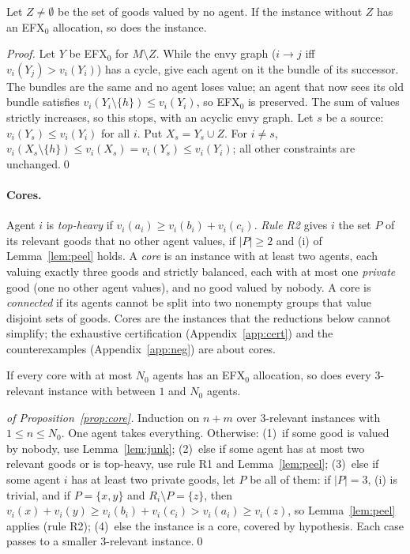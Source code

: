 \documentclass[runningheads,11pt]{llncs}
\newcommand{\efxz}{\texorpdfstring{\mbox{EFX$_0$}}{EFX0}}
\begin{document}
\begin{lemma}\label{lem:junk}
Let $Z\ne\emptyset$ be the set of goods valued by no agent. If the instance without $Z$ has an \efxz{} allocation, so does the instance.
\end{lemma}

\begin{proof}
Let $Y$ be \efxz{} for $M\setminus Z$. While the envy graph ($i\to j$ iff $v_i(Y_j)>v_i(Y_i)$) has a cycle, give each agent on it the bundle of its successor. The bundles are the same and no agent loses value; an agent that now sees its old bundle satisfies $v_i(Y_i\setminus\{h\})\le v_i(Y_i)$, so \efxz{} is preserved. The sum of values strictly increases, so this stops, with an acyclic envy graph. Let $s$ be a source: $v_i(Y_s)\le v_i(Y_i)$ for all $i$. Put $X_s=Y_s\cup Z$. For $i\ne s$, $v_i(X_s\setminus\{h\})\le v_i(X_s)=v_i(Y_s)\le v_i(Y_i)$; all other constraints are unchanged.\qed
\end{proof}

\paragraph{Cores.} Agent $i$ is \emph{top-heavy} if $v_i(a_i)\ge v_i(b_i)+v_i(c_i)$. \emph{Rule R2} gives $i$ the set $P$ of its relevant goods that no other agent values, if $|P|\ge2$ and (i) of Lemma~\ref{lem:peel} holds. A \emph{core} is an instance with at least two agents, each valuing exactly three goods and strictly balanced, each with at most one \emph{private} good (one no other agent values), and no good valued by nobody. A core is \emph{connected} if its agents cannot be split into two nonempty groups that value disjoint sets of goods. Cores are the instances that the reductions below cannot simplify; the exhaustive certification (Appendix~\ref{app:cert}) and the counterexamples (Appendix~\ref{app:neg}) are about cores.

\begin{proposition}\label{prop:core}
If every core with at most $N_0$ agents has an \efxz{} allocation, so does every $3$-relevant instance with between $1$ and $N_0$ agents.
\end{proposition}

\begin{proof}[of Proposition~\ref{prop:core}]
Induction on $n+m$ over $3$-relevant instances with $1\le n\le N_0$. One agent takes everything. Otherwise: (1)~if some good is valued by nobody, use Lemma~\ref{lem:junk}; (2)~else if some agent has at most two relevant goods or is top-heavy, use rule R1 and Lemma~\ref{lem:peel}; (3)~else if some agent $i$ has at least two private goods, let $P$ be all of them: if $|P|=3$, (i) is trivial, and if $P=\{x,y\}$ and $R_i\setminus P=\{z\}$, then $v_i(x)+v_i(y)\ge v_i(b_i)+v_i(c_i)>v_i(a_i)\ge v_i(z)$, so Lemma~\ref{lem:peel} applies (rule R2); (4)~else the instance is a core, covered by hypothesis. Each case passes to a smaller $3$-relevant instance.\qed
\end{proof}
\end{document}
